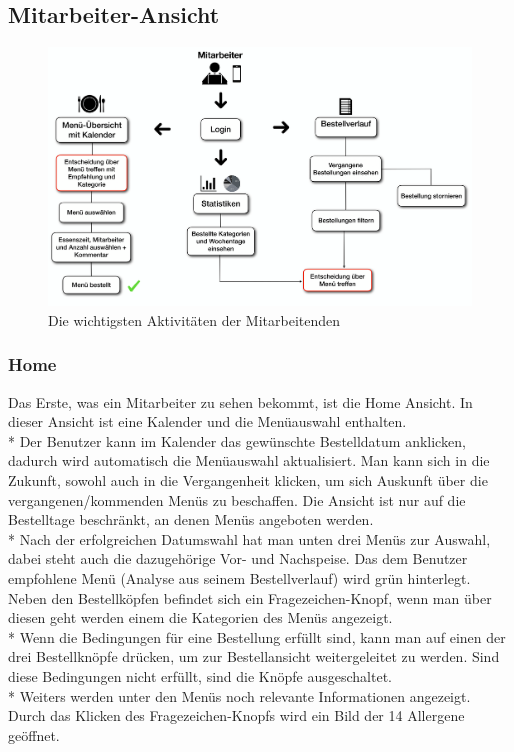 \subsection {Mitarbeiter-Ansicht}
\begin{figure}[htp]
    \centering
    \includegraphics[scale=0.125]{pics/activity-mitarbeiter.png}
    \caption{Die wichtigsten Aktivitäten der Mitarbeitenden}
    \label{fig:impl:ActEmployee}
\end{figure}

\subsubsection {Home}
\label{sec:MitHome}
Das Erste, was ein Mitarbeiter zu sehen bekommt, ist die Home Ansicht. In dieser Ansicht ist eine Kalender und die Menüauswahl enthalten. \\*
Der Benutzer kann im Kalender das gewünschte Bestelldatum anklicken, dadurch wird automatisch die Menüauswahl aktualisiert. Man kann sich in die Zukunft, sowohl auch 
in die Vergangenheit klicken, um sich Auskunft über die vergangenen/kommenden Menüs zu beschaffen. Die Ansicht ist nur auf die Bestelltage beschränkt, an denen Menüs angeboten werden.\\*
Nach der erfolgreichen Datumswahl hat man unten drei Menüs zur Auswahl, dabei steht auch die dazugehörige Vor- und Nachspeise. Das dem Benutzer empfohlene Menü (Analyse aus seinem Bestellverlauf) wird grün hinterlegt.
Neben den Bestellköpfen befindet sich ein Fragezeichen-Knopf, wenn man über diesen geht werden einem die Kategorien des Menüs angezeigt.
\\* Wenn die Bedingungen für eine Bestellung erfüllt sind,
kann man auf einen der drei Bestellknöpfe drücken, um zur Bestellansicht weitergeleitet zu werden. Sind diese Bedingungen nicht erfüllt, sind die Knöpfe ausgeschaltet. \\*
Weiters werden unter den Menüs noch relevante Informationen angezeigt. Durch das Klicken des Fragezeichen-Knopfs wird ein Bild der 14 Allergene geöffnet.

